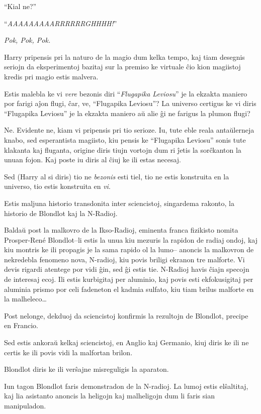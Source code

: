 ``Kial ne?''

“\emph{AAAAAAAAARRRRRRGHHHH!}”

\emph{Pok, Pok, Pok.}

Harry pripensis pri la naturo de la magio dum kelka tempo, kaj tiam
desegnis seriojn da eksperimentoj bazitaj sur la premiso ke virtuale
ĉio kion magiistoj kredis pri magio estis malvera.

Estis malebla ke vi \emph{vere} bezonis diri ``\emph{Flugapika
  Leviosu}'' je la ekzakta maniero por farigi aĵon flugi, ĉar, ve,
``Flugapika Leviosu''?  La universo certigus ke vi diris ``Flugapika
Leviosu'' je la ekzakta maniero aŭ alie ĝi ne farigus la plumon flugi?

Ne. Evidente ne, kiam vi pripensis pri tio serioze. Iu, tute eble
reala antaŭlerneja knabo, sed esperantista magiisto, kiu pensis ke
``Flugapika Leviosu'' sonis tute klakanta kaj fluganta, origine diris
tiujn vortojn dum ri ĵetis la sorĉkanton la unuan fojon. Kaj poste iu
diris al ĉiuj ke ili estas necesaj.

Sed (Harry al si diris) tio ne \emph{bezonis} esti tiel, tio ne estis
konstruita en la universo, tio estis konstruita en \emph{vi}.

Estis maljuna historio transdonita inter sciencistoj, singardema
rakonto, la historio de Blondlot kaj la N-Radioj.

Baldaŭ post la malkovro de la Ikso-Radioj, eminenta franca fizikisto
nomita Prosper-René Blondlot--li estis la unua kiu mezuris la rapidon
de radiaj ondoj, kaj kiu montris ke ili propagis je la sama rapido ol
la lumo-- anoncis la malkovron de nekredebla fenomeno nova, N-radioj,
kiu povis briligi ekranon tre malforte. Vi devis rigardi atentege por
vidi ĝin, sed ĝi estis tie. N-Radioj havis ĉiajn specojn de interesaj
ecoj. Ili estis kurbigitaj per aluminio, kaj povis esti ekfokusigitaj
per aluminia prismo por celi fadeneton el kadmia sulfato, kiu tiam
brilus malforte en la malheleco\ldots

Post nelonge, dekduoj da sciencistoj konfirmis la rezultojn de
Blondlot, precipe en Francio.

Sed estis ankoraŭ kelkaj sciencistoj, en Anglio kaj Germanio, kiuj
diris ke ili ne certis ke ili povis vidi la malfortan brilon.

Blondlot diris ke ili verŝajne misreguligis la aparaton.

Iun tagon Blondlot faris demonstradon de la N-radioj. La lumoj estis
elŝaltitaj, kaj lia asistanto anoncis la heligojn kaj malheligojn dum
li faris sian manipuladon.

